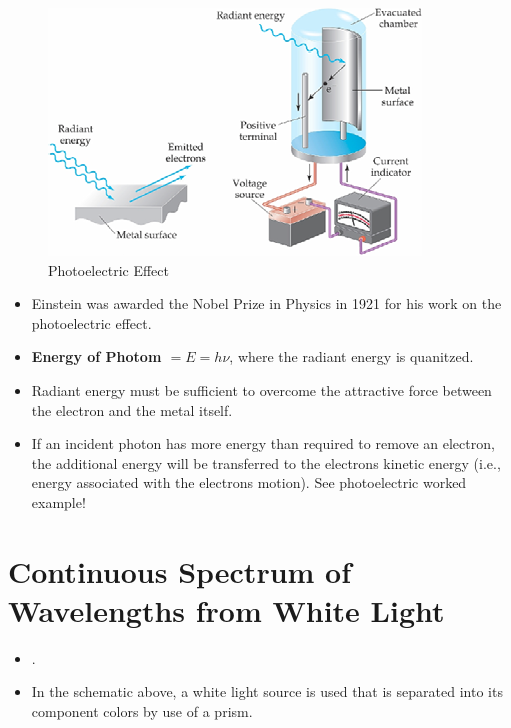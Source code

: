 \documentclass[
	chapter=7,
	title={Quantum Theory {\&} the Electronic Structure of Atoms},
	showanswers=true,
]{chem122notes}
\begin{document}
\begin{figure}[H]
	\centering
	\includegraphics[width=\textwidth]{chapter7/photoelectric_effect}
	\caption{Photoelectric Effect}
	\label{fig:photoelectric-effect}
\end{figure}

\begin{itemize}
	\item Einstein was awarded the Nobel Prize in Physics in 1921 for his work on the photoelectric effect.
	\item \textbf{Energy of Photom $= E = h\nu$}, where the radiant energy is quanitzed.
	\item Radiant energy must be sufficient to overcome the attractive force between the electron and the metal itself.
	\item If an incident photon has more energy than required to remove an electron, the additional energy will be transferred to the electrons kinetic energy (i.e., energy associated with the electrons motion).
	See photoelectric worked example!
\end{itemize}

\section{Continuous Spectrum of Wavelengths from White Light}\label{sec:continuous-spectrum-of-wavelengths-from-white-light}
\begin{itemize}
	\item {}.
	\item In the schematic above, a white light source is used that is separated into its component colors by use of a prism.
\end{itemize}
\end{document}
